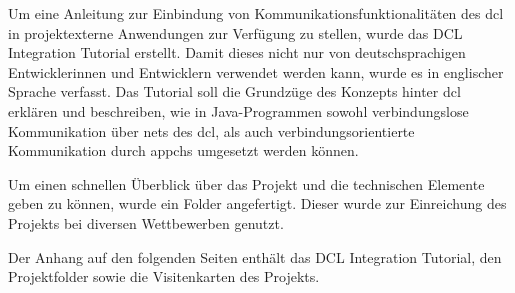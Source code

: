 
Um eine Anleitung zur Einbindung von Kommunikationsfunktionalitäten des
\gls{dcl} in projektexterne Anwendungen zur Verfügung zu stellen, wurde das
DCL Integration Tutorial erstellt.
Damit dieses nicht nur von deutschsprachigen Entwicklerinnen und Entwicklern
verwendet werden kann, wurde es in englischer Sprache verfasst.
Das Tutorial soll die Grundzüge des Konzepts hinter \gls{dcl} erklären und
beschreiben, wie in Java-Programmen sowohl verbindungslose Kommunikation über
\glspl{net} des \gls{dcl}, als auch verbindungsorientierte Kommunikation durch
\glspl{appch} umgesetzt werden können.

Um einen schnellen Überblick über das Projekt und die technischen Elemente geben
zu können, wurde ein Folder angefertigt.
Dieser wurde zur Einreichung des Projekts bei diversen Wettbewerben genutzt.

Der Anhang auf den folgenden Seiten enthält das DCL Integration Tutorial, den
Projektfolder sowie die Visitenkarten des Projekts.
